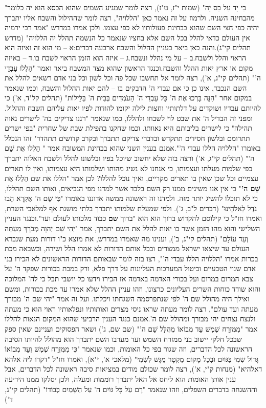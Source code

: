 \documentclass[12pt, openany]{book}
\begin{document}
"כִּי יָד עַל כֵּס יָהּ" (שמות י"ז, ט"ז), רצה לומר שמגיע השמים שהוא הכסא הוא יה כלומר מהבחינה השניה. ולרמוז על זה נאמר כאן "הללויה", רצה לומר שההילול והשבח אליו יתברך יהיה כפי חצי השם שהוא בבחינת פעולותיו לא כפי עצמו. ולכן אמרו במדרש "אמר רבי ירמיה אין העולם כדאי להלל בכל השם אלא בחציו שנאמר כל הנשמה תהלל יה הללויה" (מדרש תהלים קי"ג).והנה כאן ביאר בעניין ההלול והשבח ארבעה דברים:א – מי הוא זה ואיזה הוא הראוי והלל ולשבח.ב – על מי נהלל ונשבח.ג – איזה הוא הזמן הראוי לשבח בו.ד – באיזה מקום או ארץ יאות ההלל והשבח.וכנגד הראשון שהוא מצד המשבח ביאר ואמר "הַלְלוּ עַבְדֵי ה'" (תהלים קי"ג, א'), רצה לומר אל תחשבו שכל פה וכל לשון וכל בני אדם רשאים להלל את השם הנכבד, אינו כן כי אם עבדי ה' הדבקים בו – להם יאות ההלול והשבח, וכמו שנאמר במקום אחר "הִנֵּה בָּרְכוּ אֶת ה' כָּל עַבְדֵי ה' הָעֹמְדִים בְּבֵית ה' בַּלֵּילוֹת" (תהלים קל"ד, א') כי להיותם עבדיו ושוקדים על דלתותיו וחצות לילה יקומו להודות לפיו יאות עליהם השבח וההלול. ומפני זה הבדיל ה' את שבט לוי לשבחו ולהללו, כמו שנאמר "רננו צדיקים בה' לישרים נאוה תהילה" כי לישרים בליבותם היא נאוותו. וכמו שחקנו בתפילת שבת של שחרית "בפי ישרים תתרומם ובלשון חסידים תתקדש ובדברי צדיקם תתברך ובקרב קדושים תתהדר" זהו הנכלל באומרו "הללויה הללו עבדי ה'".אמנם בענין השני שהוא בבחינת המשובח אמר " הַלְלוּ אֶת שֵׁם ה'" (תהלים קי"ג, א') ורצה בזה שלא יחשוב שיוכל בפיו ובלשונו להלל ולשבח האלוה יתברך כפי שלמות מעלתו ועצמותו, כי אנחנו לא נשיג מהותו ושלמותו היא עצמותו, ואין לו תארים עצמיים וכל שכן שאין בו תארים מקריים, ואיך נוכל להללו?  לכן אמר "הללו את שם הַלְלוּ אֶת \textrm{\textbf{שֵׁם ה'}}" כי אין אנו משיגים ממנו רק השם בלבד אשר למדנו מפי הנביאים, ואותו השם תהללו, כי לא תוכלו להשיג יותר מזה. ולמדנו זה ראשונה ממשה אדוננו באומרו "כִּי שֵׁם ה' אֶקְרָא הָבוּ גֹדֶל לֵאלֹהֵינוּ" (דברים ל"ב, ג'). ולפי שמעלת שלמותו יתברך בלתי מושגת אף למלאכי השרת, ואמרו חז"ל כי קילוסם להקדוש ברוך הוא הוא "ברוך \textrm{\textbf{שם}} כבוד מלכותו לעולם ועד".וכנגד העניין השלישי והוא מהו הזמן אשר בו יאות להלל את השם יתברך, אמר "יְהִי שֵׁם יְהוָה מְבֹרָךְ מֵעַתָּה וְעַד עוֹלָם" (תהלים קי"ג, ב'), וענינו מה שאמרו במדרש, את מוצא כ"ו דורות מעת שנברא העולם עד שיצאו ישראל ממצרים ובכל אותם הדורות לא אמרו הלל ושירה, וכשבאה מכת בכרות אמרו "הללויה הללו עבדי ה'", רצו בזה לומר שבאותם הדורות הראשונים לא הכירו בני אדם שנוי הטבעיים וביטול המערכות העליונות על דרך פלא, ורק במכת בכורות שפקד ה' על צבא המרום במרום ועל בכורי האדמה באדמה אז הכירו וידעו כל יושבי תבל כי לה' המלוכה והוא שודד כוחות השרים העליונים כרצונו, וזהו עניין ההלל שלא אמרו עד מכת בכורות, ומשם ואילך היה מהולל שם ה' לפי שנתפרסמה השגחתו ויכלתו. ועל זה אמר "יהי שם ה' מבורך מעתה ועד עולם", רצה לומר מעתה שראו ניסי מצרים ואותותיו ונפלאותיו ראוי הוא כי מעתה ולנצח נצחים יהי מבורך ומהולל שם ה'.אמנם כנגד הענין הרביעי שהוא המקום הנאות להללו אמר "מִמִּזְרַח שֶׁמֶשׁ עַד מְבוֹאוֹ מְהֻלָּל שֵׁם ה'" (שם שם, ג') ושאר הפסוקים ועניינם שאין ספק שבכל חלקי יישוב בני ממזרח השמש ועד מערבו השם יתברך הוא מהולל להיותו הסיבה הראשונה לכל הדברים, וזה שגור בפי כל האומות, וכמו שנאמר "כִּי מִמִּזְרַח שֶׁמֶשׁ וְעַד מְבוֹאוֹ גָּדוֹל שְׁמִי בַּגּוֹיִם וּבְכָל מָקוֹם מֻקְטָר מֻגָּשׁ לִשְׁמִי" (מלאכי א', י"א), ואמרו חז"ל "דקרו ליה אלהא דאלהיא" (מנחות ק"י, א'), רצה לומר שכולם מודים במציאות סיבה ראשונה לכל הדברים, אבל ענין אותן האומות הוא ליחס אל האל יתברך רוממות ומעלה, ולכן יסלקו ממנו הידיעה וההשגחה בדברים השפלים, וזהו שנאמר "רָם עַל כָּל גּוֹיִם ה' עַל הַשָּׁמַיִם כְּבוֹדוֹ" (תהלים קי"ג, ד') 
\end{document}
